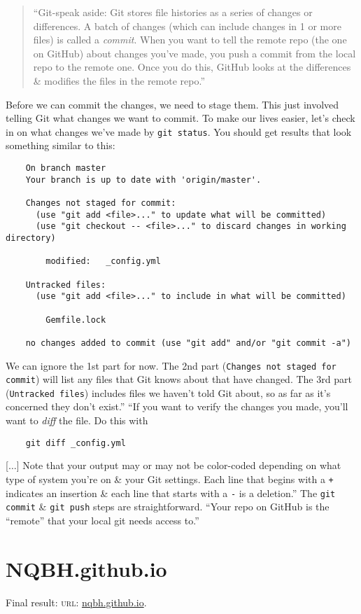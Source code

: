 \documentclass{article}
\numberwithin{equation}{section}
\begin{document}
\begin{quotation}
	``Git-speak aside: Git stores file histories as a series of changes or differences. A batch of changes (which can include changes in 1 or more files) is called a \emph{commit}. When you want to tell the remote repo (the one on GitHub) about changes you've made, you push a commit from the local repo to the remote one. Once you do this, GitHub looks at the differences \& modifies the files in the remote repo.''
\end{quotation}
Before we can commit the changes, we need to stage them. This just involved telling Git what changes we want to commit. To make our lives easier, let's check in on what changes we've made by \texttt{git status}. You should get results that look something similar to this:
\begin{verbatim}
	On branch master
	Your branch is up to date with 'origin/master'.
	
	Changes not staged for commit:
	  (use "git add <file>..." to update what will be committed)
	  (use "git checkout -- <file>..." to discard changes in working directory)
	
		modified:   _config.yml
	
	Untracked files:
	  (use "git add <file>..." to include in what will be committed)
	
		Gemfile.lock
	
	no changes added to commit (use "git add" and/or "git commit -a")
\end{verbatim}
We can ignore the 1st part for now. The 2nd part (\texttt{Changes not staged for commit}) will list any files that Git knows about that have changed. The 3rd part (\texttt{Untracked files}) includes files we haven't told Git about, so as far as it's concerned they don't exist.'' ``If you want to verify the changes you made, you'll want to \textit{diff} the file. Do this with
\begin{verbatim}
	git diff _config.yml
\end{verbatim}
[$\ldots$] Note that your output may or may not be color-coded depending on what type of system you're on \& your Git settings. Each line that begins with a \texttt{+} indicates an insertion \& each line that starts with a \texttt{-} is a deletion.'' The \texttt{git commit} \& \texttt{git push} steps are straightforward. ``Your repo on GitHub is the ``remote'' that your local git needs access to.''

\section{NQBH.github.io}
Final result: \textsc{url}: \url{nqbh.github.io}.
\end{document}
